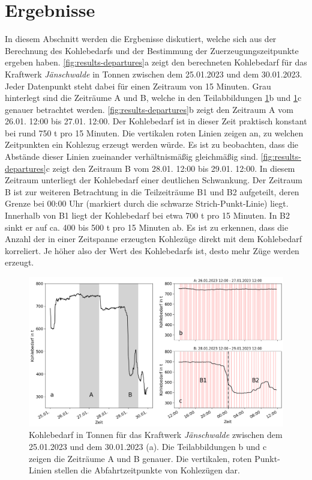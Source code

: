 \section{Ergebnisse}

In diesem Abschnitt werden die Ergbenisse diskutiert, welche sich aus der Berechnung des Kohlebedarfs und der Bestimmung der Zuerzeugungszeitpunkte ergeben haben. \autoref{fig:results-departures}a zeigt den berechneten Kohlebedarf für das Kraftwerk \emph{Jänschwalde} in Tonnen zwischen dem 25.01.2023 und dem 30.01.2023. Jeder Datenpunkt steht dabei für einen Zeitraum von 15 Minuten. Grau hinterlegt sind die Zeiträume A und B, welche in den Teilabbildungen \ref{fig:results-departures}b und \ref{fig:results-departures}c genauer betrachtet werden. \autoref{fig:results-departures}b zeigt den Zeitraum A vom 26.01. 12:00 bis 27.01. 12:00. Der Kohlebedarf ist in dieser Zeit praktisch konstant bei rund 750 t pro 15 Minuten. Die vertikalen roten Linien zeigen an, zu welchen Zeitpunkten ein Kohlezug erzeugt werden würde. Es ist zu beobachten, dass die Abstände dieser Linien zueinander verhältnismäßig gleichmäßig sind. \autoref{fig:results-departures}c zeigt den Zeitraum B vom 28.01. 12:00 bis 29.01. 12:00. In diesem Zeitraum unterliegt der Kohlebedarf einer deutlichen Schwankung. Der Zeitraum B ist zur weiteren Betrachtung in die Teilzeiträume B1 und B2 aufgeteilt, deren Grenze bei 00:00 Uhr (markiert durch die schwarze Strich-Punkt-Linie) liegt. Innerhalb von B1 liegt der Kohlebedarf bei etwa 700 t pro 15 Minuten. In B2 sinkt er auf ca. 400 bis 500 t pro 15 Minuten ab. Es ist zu erkennen, dass die Anzahl der in einer Zeitspanne erzeugten Kohlezüge direkt mit dem Kohlebedarf korreliert. Je höher also der Wert des Kohlebedarfs ist, desto mehr Züge werden erzeugt.

\begin{figure}[!ht]
	\centering
	\includegraphics[width=1.0\linewidth]{images/results/departures.png}
	\caption{Kohlebedarf in Tonnen für das Kraftwerk \emph{Jänschwalde} zwischen dem 25.01.2023 und dem 30.01.2023 (a). Die Teilabbildungen b und c zeigen die Zeiträume A und B genauer. Die vertikalen, roten Punkt-Linien stellen die Abfahrtzeitpunkte von Kohlezügen dar.}
	\label{fig:results-departures}
\end{figure}

